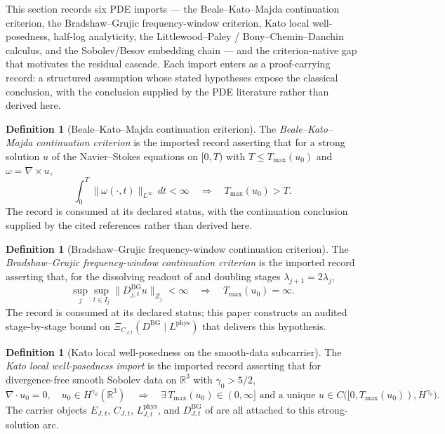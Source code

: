 \documentclass[11pt]{article}
\newcommand{\DBG}{D^{\mathrm{BG}}}
\newcommand{\Lphys}{L^{\mathrm{phys}}}
\newcommand{\Tmax}{T_{\max}}
\theoremstyle{definition}
\newtheorem{definition}[theorem]{Definition}
\begin{document}
This section records six PDE imports --- the Beale--Kato--Majda
continuation criterion, the Bradshaw--Grujic frequency-window criterion,
Kato local well-posedness, half-log analyticity, the
Littlewood--Paley / Bony--Chemin--Danchin calculus, and the
Sobolev/Besov embedding chain --- and the criterion-native gap that
motivates the residual cascade.  Each import enters as a proof-carrying
record: a structured assumption whose stated hypotheses expose the
classical conclusion, with the conclusion supplied by the PDE
literature rather than derived here.

\begin{definition}[Beale--Kato--Majda continuation criterion]\label{def:ns:bkm-import}
The \emph{Beale--Kato--Majda continuation criterion}
\citep{BealeKatoMajda1984,MajdaBertozzi2002,RobinsonRodrigoSadowski2016}
is the imported record asserting that for a strong solution
\(u\) of the Navier--Stokes equations on \([0,T)\) with
\(T\le\Tmax(u_0)\) and \(\omega=\nabla\times u\),
\[
  \int_0^T \|\omega(\cdot,t)\|_{L^\infty}\,dt < \infty
  \quad\Longrightarrow\quad
  \Tmax(u_0)>T .
\]
The record is consumed at its declared status, with the
continuation conclusion supplied by the cited references
rather than derived here.
\end{definition}

\begin{definition}[Bradshaw--Grujic frequency-window continuation criterion]\label{def:ns:bg-import}
The \emph{Bradshaw--Grujic frequency-window continuation
criterion} \citep{BradshawGrujic2017} is the imported
record asserting that, for the dissolving readout of
 and doubling stages
\(\lambda_{j+1}=2\lambda_j\),
\[
  \sup_j\sup_{t\in I_j}\|\DBG_{j,t}u\|_{Z_j}<\infty
  \quad\Longrightarrow\quad
  \Tmax(u_0)=\infty .
\]
The record is consumed at its declared status; this paper
constructs an audited stage-by-stage bound on
\(\Xi_{C_{J,t}}(\DBG\mid\Lphys)\) that delivers this
hypothesis.
\end{definition}

\begin{definition}[Kato local well-posedness on the smooth-data subcarrier]\label{def:ns:kato-import}
The \emph{Kato local well-posedness import}
\citep{Kato1972,FujitaKato1964,RobinsonRodrigoSadowski2016}
is the imported record asserting that for divergence-free
smooth Sobolev data on \(\mathbb R^3\) with
\(\gamma_0>5/2\),
\[
  \nabla\cdot u_0=0,\quad u_0\in H^{\gamma_0}(\mathbb R^3)
  \quad\Longrightarrow\quad
  \exists\,\Tmax(u_0)\in(0,\infty]\text{ and a unique }
  u\in C\bigl([0,\Tmax(u_0)),H^{\gamma_0}\bigr).
\]
The carrier objects \(E_{J,t}\), \(C_{J,t}\),
\(\Lphys_{J,t}\), and \(\DBG_{J,t}\) of
 are all attached to this
strong-solution arc.
\end{definition}
\end{document}
